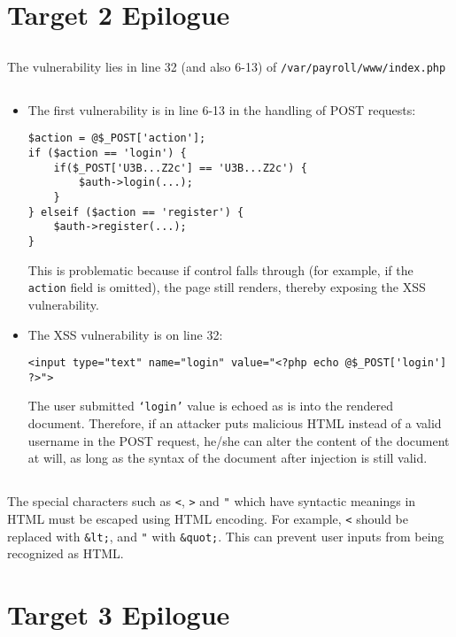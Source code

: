 \documentclass[11pt]{article}
\begin{document}
\section{Target 2 Epilogue}
\subsection{}
The vulnerability lies in line 32 (and also 6-13) of \texttt{/var/payroll/www/index.php}
\subsection{}
\begin{itemize}
\item The first vulnerability is in line 6-13 in the handling of POST requests:
\begin{verbatim}
$action = @$_POST['action'];
if ($action == 'login') { 
    if($_POST['U3B...Z2c'] == 'U3B...Z2c') {
        $auth->login(...);
    }
} elseif ($action == 'register') {
    $auth->register(...);
}
\end{verbatim}
This is problematic because if control falls through (for example, if the \texttt{action} field is omitted), the page still renders, thereby exposing the XSS vulnerability.
\item The XSS vulnerability is on line 32:
\begin{verbatim}
<input type="text" name="login" value="<?php echo @$_POST['login'] ?>">
\end{verbatim}
The user submitted \texttt{`login'} value is echoed as is into the rendered document. Therefore, if an attacker puts malicious HTML instead of a valid username in the POST request, he/she can alter the content of the document at will, as long as the syntax of the document after injection is still valid.
\end{itemize}
\subsection{}
The special characters such as \texttt{<}, \texttt{>} and \texttt{"} which have syntactic meanings in HTML must be escaped using HTML encoding. For example, \texttt{<} should be replaced with \texttt{\&lt;}, and \texttt{"} with \texttt{\&quot;}. This can prevent user inputs from being recognized as HTML.

\section{Target 3 Epilogue}
\end{document}

